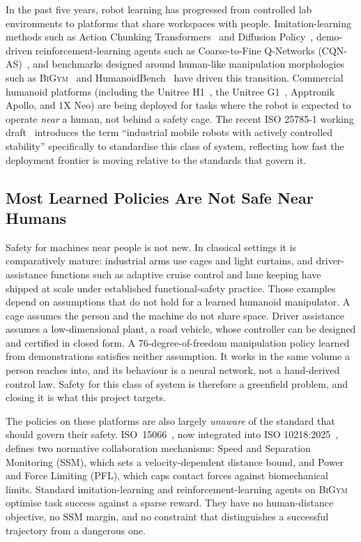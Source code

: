 \documentclass[11pt,a4paper]{report}
\newcommand{\ssm}{SSM}
\newcommand{\pfl}{PFL}
\newcommand{\iso}{ISO~15066}
\newcommand{\bigym}{\textsc{BiGym}}
\newcommand{\cqnas}{CQN-AS}
\begin{document}
In the past five years, robot learning has progressed from
controlled lab environments to platforms that share workspaces with
people. Imitation-learning methods such as Action Chunking
Transformers~\cite{zhao2023act} and Diffusion
Policy~\cite{chi2023diffusion}, demo-driven reinforcement-learning
agents such as Coarse-to-Fine Q-Networks
(\cqnas{})~\cite{seo2024cqnas}, and benchmarks designed around
human-like manipulation morphologies such as
\bigym{}~\cite{chernyadev2024bigym} and
HumanoidBench~\cite{sferrazza2024humanoidbench} have driven this
transition. Commercial humanoid platforms (including the Unitree
H1~\cite{unitree_h1}, the Unitree G1~\cite{unitree_g1},
Apptronik Apollo, and 1X Neo) are being deployed for tasks where the
robot is expected to operate \emph{near} a human, not behind a
safety cage. The recent ISO 25785-1 working draft~\cite{iso25785}
introduces the term ``industrial mobile robots with actively
controlled stability'' specifically to standardise this class of
system, reflecting how fast the deployment frontier is moving
relative to the standards that govern it.

\subsection{Most Learned Policies Are Not Safe Near Humans}
\label{sec:intro:mot:unsafe}

Safety for machines near people is not new. In classical settings it
is comparatively mature: industrial arms use cages and light curtains,
and driver-assistance functions such as adaptive cruise control and
lane keeping have shipped at scale under established functional-safety
practice. Those examples depend on assumptions that do not hold for a
learned humanoid manipulator. A cage assumes the person and the machine
do not share space. Driver assistance assumes a low-dimensional plant,
a road vehicle, whose controller can be designed and certified in
closed form. A 76-degree-of-freedom manipulation policy learned from
demonstrations satisfies neither assumption. It works in the same
volume a person reaches into, and its behaviour is a neural network,
not a hand-derived control law. Safety for this class of system is
therefore a greenfield problem, and closing it is what this project
targets.

The policies on these platforms are also largely \emph{unaware} of the
standard that should govern their safety. \iso{}~\cite{iso15066}, now
integrated into ISO 10218:2025~\cite{iso10218}, defines two normative
collaboration mechanisms: Speed and Separation Monitoring (\ssm{}),
which sets a velocity-dependent distance bound, and Power and Force
Limiting (\pfl{}), which caps contact forces against biomechanical
limits. Standard imitation-learning and reinforcement-learning agents
on \bigym{}~\cite{chernyadev2024bigym} optimise task success against a
sparse reward. They have no human-distance objective, no \ssm{} margin,
and no constraint that distinguishes a successful trajectory from a
dangerous one.
\end{document}
